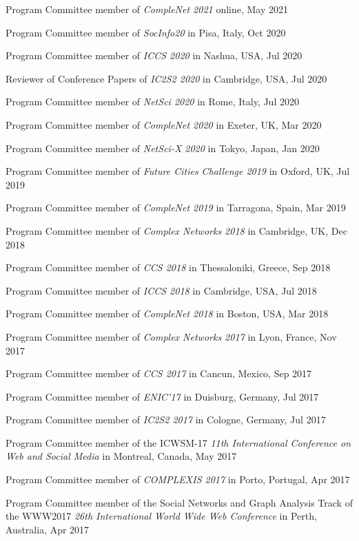 \documentclass[10pt,a4paper]{article}
\renewenvironment{itemize}{
  \begin{list}{}{
    \setlength{\leftmargin}{1.5em}
    \setlength{\itemsep}{0.25em}
    \setlength{\parskip}{0pt}
    \setlength{\parsep}{0.25em}
  }
}{
  \end{list}
}
\begin{document}
\begin{itemize}
\item{Program Committee member of \emph{CompleNet 2021} online, May 2021}
\item{Program Committee member of \emph{SocInfo20} in Pisa, Italy, Oct 2020}
\item{Program Committee member of \emph{ICCS 2020} in Nashua, USA, Jul 2020}
\item{Reviewer of Conference Papers of \emph{IC2S2 2020} in Cambridge, USA, Jul 2020}
\item{Program Committee member of \emph{NetSci 2020} in Rome, Italy, Jul 2020}
\item{Program Committee member of \emph{CompleNet 2020} in Exeter, UK, Mar 2020}
\item{Program Committee member of \emph{NetSci-X 2020} in Tokyo, Japan, Jan 2020}
\item{Program Committee member of \emph{Future Cities Challenge 2019} in Oxford, UK, Jul 2019}
\item{Program Committee member of \emph{CompleNet 2019} in Tarragona, Spain, Mar 2019}
\item{Program Committee member of \emph{Complex Networks 2018} in Cambridge, UK, Dec 2018}
\item{Program Committee member of \emph{CCS 2018} in Thessaloniki, Greece, Sep 2018}
\item{Program Committee member of \emph{ICCS 2018} in Cambridge, USA, Jul 2018}
\item{Program Committee member of \emph{CompleNet 2018} in Boston, USA, Mar 2018}
\item{Program Committee member of \emph{Complex Networks 2017} in Lyon, France, Nov 2017}
\item{Program Committee member of \emph{CCS 2017} in Cancun, Mexico, Sep 2017}
\item{Program Committee member of \emph{ENIC'17} in Duisburg, Germany, Jul 2017}
\item{Program Committee member of \emph{IC2S2 2017} in Cologne, Germany, Jul 2017}
\item{Program Committee member of the ICWSM-17 \emph{11th International Conference on Web and Social Media} in Montreal, Canada, May 2017} 
\item{Program Committee member of \emph{COMPLEXIS 2017} in Porto, Portugal, Apr 2017} 
\item{Program Committee member of the Social Networks and Graph Analysis Track of the WWW2017 \emph{26th International World Wide Web Conference} in Perth, Australia, Apr 2017} 

\end{itemize}
\end{document}
